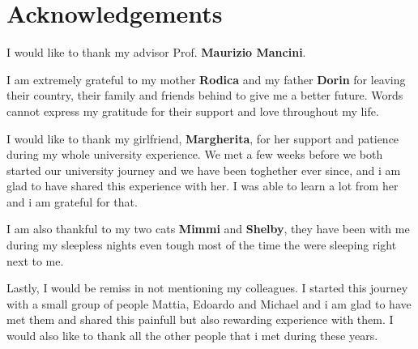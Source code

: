 \chapter*{Acknowledgements}
    \begin{large}
    I would like to thank my advisor Prof. \textbf{Maurizio Mancini}.
   
    \vspace{2mm} 
    \noindent I am extremely grateful to my mother \textbf{Rodica} and my father \textbf{Dorin} for leaving their 
    country, their family and friends behind to give me a better future.
    Words cannot express my gratitude for their support and love throughout my life. 

    \vspace{2mm}
    \noindent I would like to thank my girlfriend, \textbf{Margherita}, for her support and patience during my whole university 
    experience. We met a few weeks before we both started our university journey and we have been toghether 
    ever since, and i am glad to have shared this experience with her. I was able to learn a lot from her 
    and i am grateful for that.

    \vspace{2mm}    
    \noindent I am also thankful to my two cats \textbf{Mimmi} and \textbf{Shelby}, they 
    have been with me during my sleepless nights even tough most of the time the were sleeping right 
    next to me.
    
    \vspace{2mm} 
    \noindent Lastly, I would be remiss in not mentioning my colleagues. I started this journey with a small group 
    of people Mattia, Edoardo and Michael and i am glad to have met them and shared this painfull but also 
    rewarding experience with them. I would also like to thank all the other people that i met during these 
    years.
    

    \end{large}